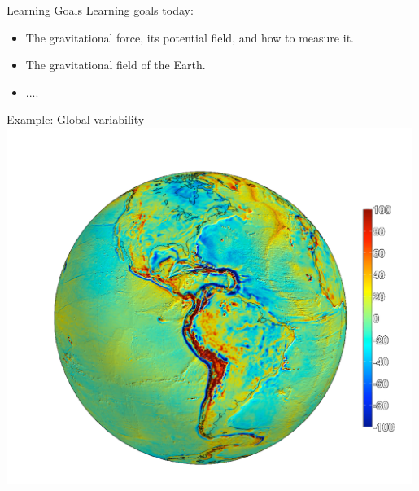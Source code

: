 \begin{frame}
    \begin{PointThree}{Learning Goals}
      \alert{Learning goals today:}
      \begin{itemize}
        \item The gravitational force, its potential field, and how to measure it.
        \item The gravitational field of the Earth.
        \item .... 
      \end{itemize}
    \end{PointThree}
    \end{frame}
    
\begin{frame}
    \begin{PointSix}{Example: Global variability}
        \includegraphics[width=0.99\textwidth]{Figures/Gravity/Exported/Grace_JPLCaltect_FODT10_WithoutPeople.png}
    \end{PointSix}
\end{frame}
    
